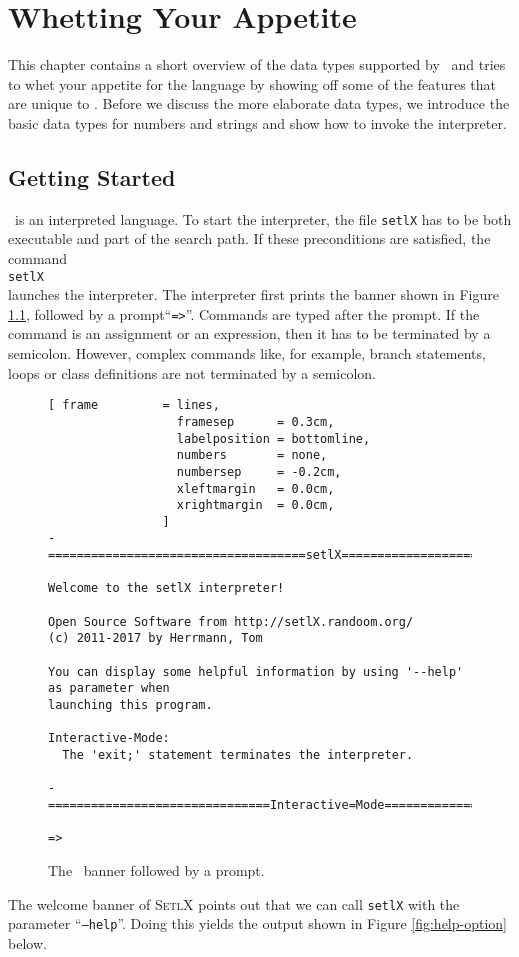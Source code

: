 \chapter{Whetting Your Appetite}
This chapter contains a short overview of the data types supported by
\setlx\ and tries to whet your appetite for the language by showing off some of
the features that are unique to \setlx.  Before we discuss the more elaborate data types,
we introduce the basic data types for numbers and strings and show how to invoke the interpreter.


\section{Getting Started}
\setlx\ is an interpreted language.  To start the interpreter,  the file
\texttt{setlX} has to be both executable and part of the search path.   If these
preconditions are satisfied, the command
\\[0.2cm]
\hspace*{1.3cm}
\texttt{setlX}
\\[0.2cm]
 launches the interpreter.  The interpreter first prints the banner shown in Figure
\ref{fig:banner}, followed by a prompt``\texttt{=>}''.  Commands are typed after the prompt.    
If the command is an assignment or an expression, then it has to be terminated by a semicolon.
However, complex commands like, for example, branch statements, loops or class definitions are not
terminated by a semicolon. 

\begin{figure}[!ht]
\centering
\begin{Verbatim}[ frame         = lines, 
                  framesep      = 0.3cm, 
                  labelposition = bottomline,
                  numbers       = none,
                  numbersep     = -0.2cm,
                  xleftmargin   = 0.0cm,
                  xrightmargin  = 0.0cm,
                ]
-====================================setlX=============================v2.7.0=-

Welcome to the setlX interpreter!

Open Source Software from http://setlX.randoom.org/
(c) 2011-2017 by Herrmann, Tom

You can display some helpful information by using '--help' as parameter when
launching this program.

Interactive-Mode:
  The 'exit;' statement terminates the interpreter.

-===============================Interactive=Mode==============================-

=>
\end{Verbatim}
\vspace*{-0.3cm}
\caption{The \setlx\ banner followed by a prompt.}
\label{fig:banner}
\end{figure}
\noindent
The welcome banner of \textsc{SetlX} points out that we can call \texttt{setlX} with the parameter 
``\texttt{--help}''.   Doing this yields the output shown in Figure \ref{fig:help-option} below. 

